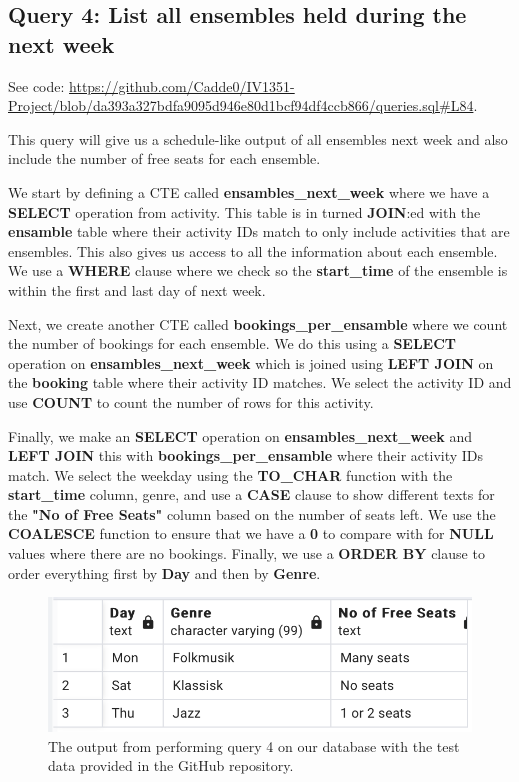 \documentclass[a4paper]{scrartcl}
\begin{document}
\subsection{Query 4: List all ensembles held during the next week}
See code: \url{https://github.com/Cadde0/IV1351-Project/blob/da393a327bdfa9095d946e80d1bcf94df4ccb866/queries.sql#L84}.

This query will give us a schedule-like output of all ensembles next week and also include the number of free seats for each ensemble.

We start by defining a CTE called \textbf{ensambles\_next\_week} where we have a \textbf{SELECT} operation from activity. This table is in turned \textbf{JOIN}:ed with the \textbf{ensamble} table where their activity IDs match to only include activities that are ensembles. This also gives us access to all the information about each ensemble. We use a \textbf{WHERE} clause where we check so the \textbf{start\_time} of the ensemble is within the first and last day of next week.

Next, we create another CTE called \textbf{bookings\_per\_ensamble} where we count the number of bookings for each ensemble. We do this using a \textbf{SELECT} operation on \textbf{ensambles\_next\_week} which is joined using \textbf{LEFT JOIN} on the \textbf{booking} table where their activity ID matches. We select the activity ID and use \textbf{COUNT} to count the number of rows for this activity.

Finally, we make an \textbf{SELECT} operation on \textbf{ensambles\_next\_week} and \textbf{LEFT JOIN} this with \textbf{bookings\_per\_ensamble} where their activity IDs match. We select the weekday using the \textbf{TO\_CHAR} function with the \textbf{start\_time} column, genre, and use a \textbf{CASE} clause to show different texts for the \textbf{"No of Free Seats" } column based on the number of seats left. We use the \textbf{COALESCE} function to ensure that we have a \textbf{0} to compare with for \textbf{NULL} values where there are no bookings. Finally, we use a \textbf{ORDER BY} clause to order everything first by \textbf{Day} and then by \textbf{Genre}.



\begin{figure}[H]
    \begin{center}
      \includegraphics[scale=0.6]{query4_output.png}
      \caption{The output from performing query 4 on our database with the test data provided in the GitHub repository.}
      \label{fig:diag}
    \end{center}
  \end{figure}
\end{document}
